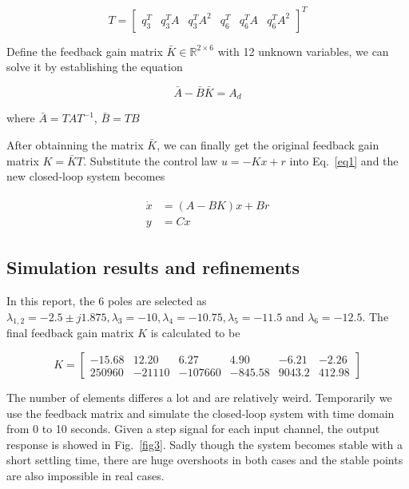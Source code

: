 \documentclass[hyperref]{article}
\theoremstyle{nonumberplain}
\begin{document}
	\begin{equation}
	T=\begin{bmatrix}
	q_{3}^{T} &q_{3}^{T}A  &q_{3}^{T}A^{2}  & q_{6}^{T} &q_{6}^{T}A  &q_{6}^{T}A^{2}
	\end{bmatrix}^{T}
	\label{eq13}
	\end{equation}
	
	Define the feedback gain matrix $\bar{K}\in \mathbb{R}^{2\times 6}$ with 12 unknown variables, we can solve it by establishing the equation
	
	\begin{equation}
	\bar{A}-\bar{B}\bar{K}=A_{d}
	\label{eq14}
	\end{equation}
	
	where $\bar{A}=TAT^{-1}$, $\bar{B}=TB$
	
	After obtainning the matrix $\bar{K}$, we can finally get the original feedback gain matrix $K=\bar{K}T$. Substitute the control law $u=-Kx+r$ into Eq.~\ref{eq1} and the new closed-loop system becomes
	
	\begin{equation}
	\begin{split}
	\begin{aligned}
	\dot{x}&=(A-BK)x+Br \\
	y&=Cx
	\label{eq15}
	\end{aligned}
	\end{split}
	\end{equation}
	
	
	\subsection{Simulation results and refinements}
	
	\hspace{1.0em}
	In this report, the 6 poles are selected as $\lambda_{1,2}=-2.5\pm j1.875, \lambda_{3}=-10, \lambda_{4}=-10.75, \lambda_{5}=-11.5$ and $\lambda_{6}=-12.5$. The final feedback gain matrix $K$ is calculated to be
	
	\begin{equation}
	K=\begin{bmatrix}
	-15.68 &12.20  &6.27  &4.90  &-6.21  &-2.26 \\ 
	250960 &-21110  &-107660  &-845.58  &9043.2  &412.98 
	\end{bmatrix}
	\nonumber
	\end{equation}
	
	The number of elements differes a lot and are relatively weird. Temporarily we use the feedback matrix and simulate the closed-loop system with time domain from 0 to 10 seconds. Given a step signal for each input channel, the output response is showed in Fig.~\ref{fig3}. Sadly though the system becomes stable with a short settling time, there are huge overshoots in both cases and the stable points are also impossible in real cases. 
	
\end{document}

